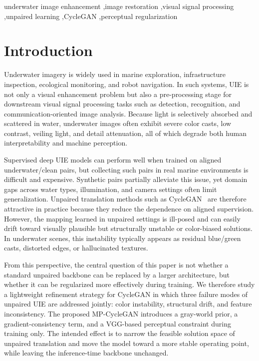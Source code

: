 \documentclass[final,1p,times]{elsarticle}
\begin{document}
\begin{frontmatter}
\begin{keyword}
underwater image enhancement \sep image restoration \sep visual signal processing \sep unpaired learning \sep CycleGAN \sep perceptual regularization
\end{keyword}

\end{frontmatter}

\section{Introduction}
Underwater imagery is widely used in marine exploration, infrastructure inspection, ecological monitoring, and robot navigation. In such systems, UIE is not only a visual enhancement problem but also a pre-processing stage for downstream visual signal processing tasks such as detection, recognition, and communication-oriented image analysis. Because light is selectively absorbed and scattered in water, underwater images often exhibit severe color casts, low contrast, veiling light, and detail attenuation, all of which degrade both human interpretability and machine perception.

Supervised deep UIE models can perform well when trained on aligned underwater/clean pairs, but collecting such pairs in real marine environments is difficult and expensive. Synthetic pairs partially alleviate this issue, yet domain gaps across water types, illumination, and camera settings often limit generalization. Unpaired translation methods such as CycleGAN~\cite{zhu2017cyclegan} are therefore attractive in practice because they reduce the dependence on aligned supervision. However, the mapping learned in unpaired settings is ill-posed and can easily drift toward visually plausible but structurally unstable or color-biased solutions. In underwater scenes, this instability typically appears as residual blue/green casts, distorted edges, or hallucinated textures.

From this perspective, the central question of this paper is not whether a standard unpaired backbone can be replaced by a larger architecture, but whether it can be regularized more effectively during training. We therefore study a lightweight refinement strategy for CycleGAN in which three failure modes of unpaired UIE are addressed jointly: color instability, structural drift, and feature inconsistency. The proposed MP-CycleGAN introduces a gray-world prior, a gradient-consistency term, and a VGG-based perceptual constraint during training only. The intended effect is to narrow the feasible solution space of unpaired translation and move the model toward a more stable operating point, while leaving the inference-time backbone unchanged.
\end{document}
